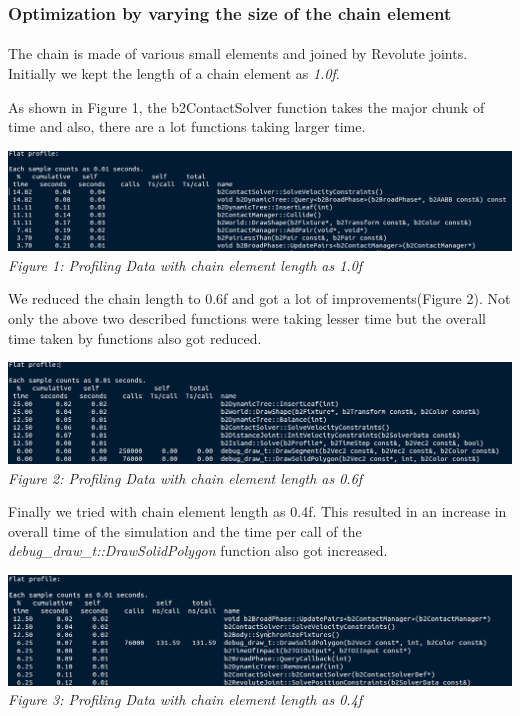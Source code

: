 \documentclass[11pt]{article}
\begin{document}
\subsubsection{Optimization by varying the size of the chain element}
\paragraph{}
The chain is made of various small elements and joined by Revolute joints. Initially we kept the length of a chain 
element as \textit{1.0f}. 

	As shown in Figure 1, the b2ContactSolver function takes the major chunk of time and also, there are a lot functions taking larger time.

\begin{center}
 \includegraphics[scale = 0.4]{images/chain1} \\
  \emph{Figure 1: Profiling Data with chain element length as 1.0f} \\
\end{center}

	We reduced the chain length to 0.6f and got a lot of improvements(Figure 2). Not only the above two described functions 
	were taking lesser time but the overall time taken by functions also got reduced.
\begin{center}
 \includegraphics[scale = 0.4]{images/chain6} \\
  \emph{Figure 2: Profiling Data with chain element length as 0.6f} \\
\end{center}

	Finally we tried with chain element length as 0.4f. This resulted in an increase in overall time of the simulation 
	and the time per call of the \textit{debug\_draw\_t::DrawSolidPolygon} function also got increased.
\begin{center}
 \includegraphics[scale = 0.4]{images/chain4} \\
  \emph{Figure 3: Profiling Data with chain element length as 0.4f} \\
\end{center}
\end{document}
